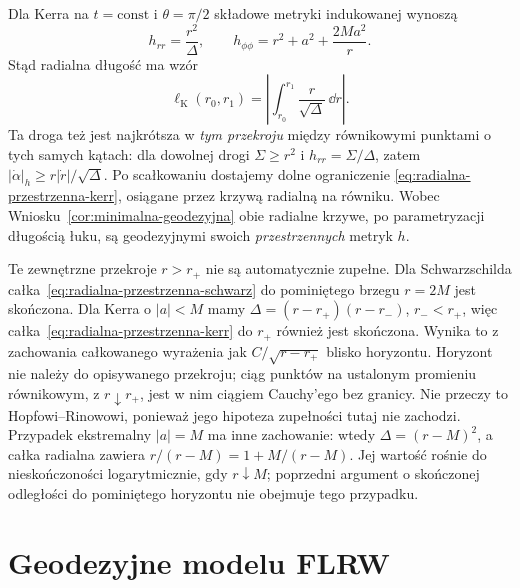 Dla Kerra na $t=\mathrm{const}$ i $\theta=\pi/2$
składowe metryki indukowanej wynoszą
\[
 h_{rr}=\frac{r^2}{\Delta},\qquad
 h_{\phi\phi}=r^2+a^2+\frac{2Ma^2}{r}.
\]
Stąd radialna długość ma wzór
\begin{equation}\label{eq:radialna-przestrzenna-kerr}
 \ell_{\mathrm K}(r_0,r_1)
   =\left|\int_{r_0}^{r_1}
                   \frac r{\sqrt\Delta}\,\dd r\right|.
\end{equation}
Ta droga też jest najkrótsza w \emph{tym przekroju}
między równikowymi punktami o tych samych
kątach: dla dowolnej drogi $\Sigma\geq r^2$
i $h_{rr}=\Sigma/\Delta$, zatem
$|\dot\alpha|_h\geq r|\dot r|/\sqrt\Delta$.
Po scałkowaniu dostajemy dolne ograniczenie
\eqref{eq:radialna-przestrzenna-kerr}, osiągane
przez krzywą radialną na równiku. Wobec
Wniosku~\ref{cor:minimalna-geodezyjna}
obie radialne krzywe, po parametryzacji
długością łuku, są geodezyjnymi swoich
\emph{przestrzennych} metryk $h$.

Te zewnętrzne przekroje $r>r_+$ nie są
automatycznie zupełne. Dla Schwarzschilda
całka~\eqref{eq:radialna-przestrzenna-schwarz}
do pominiętego brzegu $r=2M$ jest skończona.
Dla Kerra o $|a|<M$ mamy
$\Delta=(r-r_+)(r-r_-)$, $r_-<r_+$,
więc całka~\eqref{eq:radialna-przestrzenna-kerr}
do $r_+$ również jest skończona.
Wynika to z zachowania całkowanego wyrażenia
jak $C/\sqrt{r-r_+}$ blisko horyzontu.
Horyzont nie należy do opisywanego przekroju;
ciąg punktów na ustalonym promieniu równikowym,
z $r\downarrow r_+$, jest w nim ciągiem Cauchy'ego bez granicy. Nie przeczy
to Hopfowi--Rinowowi, ponieważ jego hipoteza
zupełności tutaj nie zachodzi.
Przypadek ekstremalny $|a|=M$ ma inne zachowanie:
wtedy $\Delta=(r-M)^2$, a całka radialna zawiera
$r/(r-M)=1+M/(r-M)$.
Jej wartość rośnie do nieskończoności logarytmicznie,
gdy $r\downarrow M$; poprzedni argument o skończonej
odległości do pominiętego horyzontu nie obejmuje tego przypadku.

\section{Geodezyjne modelu FLRW}
\label{sec:geodezyjne-minkowski-flrw}

